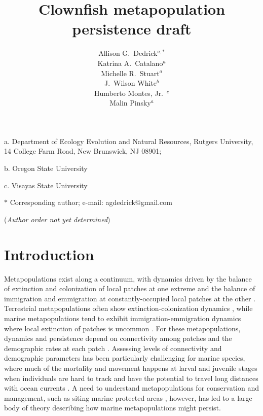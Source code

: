 \documentclass[12pt, oneside]{article}   	%
\author{}
\author{Allison G.\ Dedrick$^{a, \ast}$ \\
Katrina A.\ Catalano$^a$ \\
Michelle R.\ Stuart$^a$ \\
J.\ Wilson White$^b$ \\
Humberto Montes, Jr.\ $^c$ \\
Malin Pinsky$^a$}
\title{Clownfish metapopulation persistence draft}
\date{}
\begin{document}
\renewcommand{\topfraction}{0.95}
\maketitle{}

\noindent{} a. Department of Ecology Evolution and Natural Resources, Rutgers University, 14 College Farm Road, New Brunswick, NJ 08901;

\noindent{} b. Oregon State University

\noindent{} c. Visayas State University

\noindent{} $\ast$ Corresponding author; e-mail: agdedrick@gmail.com

(\textit{Author order not yet determined})


\bigskip



\linenumbers{}
\modulolinenumbers[3]

\section*{Introduction}

Metapopulations exist along a continuum, with dynamics driven by the balance of extinction and colonization of local patches at one extreme and the balance of immigration and emmigration at constantly-occupied local patches at the other \citep{kritzer2006marine}. Terrestrial metapopulations often show extinction-colonization dynamics \citep[e.g.][]{hanski1998metapopulation}, while marine metapopulations tend to exhibit immigration-emmigration dynamics where local extinction of patches is uncommon \citep{kritzer2006marine}. For these metapopulations, dynamics and persistence depend on connectivity among patches and the demographic rates at each patch \citep[e.g.][]{hastings_persistence_2006, hanski1998metapopulation}. Assessing levels of connectivity and demographic parameters has been particularly challenging for marine species, where much of the mortality and movement happens at larval and juvenile stages when individuals are hard to track and have the potential to travel long distances with ocean currents \citep[e.g.][]{kritzer2006marine, cowen_larval_2009, roughgarden_recruitment_1988}. A need to understand metapopulations for conservation and management, such as siting marine protected areas \citep[e.g.][]{botsford_dependence_2001,white_population_2010}, however, has led to a large body of theory describing how marine metapopulations might persist. 
\end{document}
